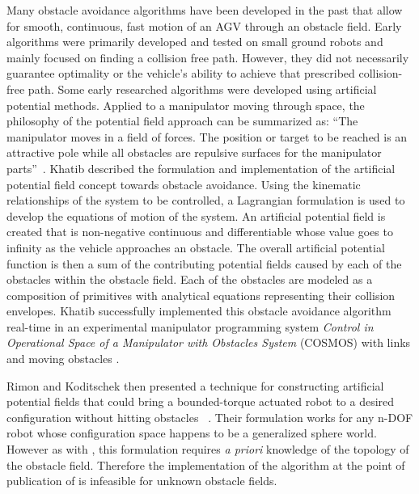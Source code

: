 \documentclass[12pt,onecolumn]{report}
\begin{document}
Many obstacle avoidance algorithms have been developed in the past that allow for smooth, continuous, fast motion of an AGV through an obstacle field. Early algorithms were primarily developed and tested on small ground robots and mainly focused on finding a collision free path. However, they did not necessarily guarantee optimality or the vehicle's ability to achieve that prescribed collision-free path. Some early researched algorithms were developed using artificial potential methods. Applied to a manipulator moving through space, the philosophy of the potential field approach can be summarized as: ``The manipulator moves in a field of forces. The position or target to be reached is an attractive pole while all obstacles are repulsive surfaces for the manipulator parts''~\cite{Khatib1986}. Khatib described the formulation and implementation of the artificial potential field concept towards obstacle avoidance. Using the kinematic relationships of the system to be controlled, a Lagrangian formulation is used to develop the equations of motion of the system. An artificial potential field is created that is non-negative continuous and differentiable whose value goes to infinity as the vehicle approaches an obstacle. The overall artificial potential function is then a sum of the contributing potential fields caused by each of the obstacles within the obstacle field. Each of the obstacles are modeled as a composition of primitives with analytical equations representing their collision envelopes. Khatib successfully implemented this obstacle avoidance algorithm real-time in an experimental manipulator programming system \textit{Control in Operational Space of a Manipulator with Obstacles System} (COSMOS) with links and moving obstacles \cite{Khatib1986}. 

Rimon and Koditschek then presented a technique for constructing artificial potential fields that could bring a bounded-torque actuated robot to a desired configuration without hitting obstacles ~\cite{Rimon&Koditschek1992}. Their formulation works for any n-DOF robot whose configuration space happens to be a generalized sphere world. However as with \cite{Khatib1986}, this formulation requires \textit{a priori} knowledge of the topology of the obstacle field. Therefore the implementation of the algorithm at the point of publication of \cite{Rimon&Koditschek1992} is infeasible for unknown obstacle fields. 
\end{document}
